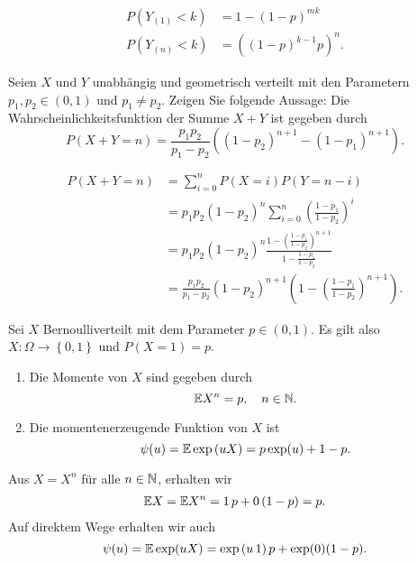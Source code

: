 \solution
\begin{align*}
    P\left( Y_{(1)} < k \right) &= 1 - \left( 1-p \right)^{mk} \\
    P\left( Y_{(n)} < k \right) &= \left( \left( 1-p \right)^{k-1} p \right)^n.
\end{align*}


 Seien $X$ und $Y$ unabhängig und geometrisch
verteilt mit den Parametern $p_1, p_2 \in (0,1)$ und $p_1\neq p_2$. Zeigen Sie folgende Aussage: 
Die Wahrscheinlichkeitsfunktion der Summe $X+Y$ ist gegeben durch
\begin{equation*}
    P(X+Y = n ) = \frac{p_1 p_2}{p_1 - p_2} \left( (1-p_2)^{n+1}- (1-p_1)^{n+1} \right).  
\end{equation*}

\solution 
\begin{align*}
    P( X+Y = n) &= \sum_{i=0}^{n} P(X=i)P(Y=n-i) \\
    &= p_1 p_2 (1-p_2)^n \sum_{i=0}^{n} \left( \frac{1-p_1}{1-p_2} \right)^{i} \\
    &=  p_1 p_2 (1-p_2)^n \frac{1 - \left( \frac{1-p_1}{1-p_2} \right)^{n+1}}{ 1- \frac{1-p_1}{1-p_2}} \\
    &= \frac{p_1 p_2}{ p_1 -p_2} (1-p_2)^{n+1}\left( 1 - \left( \frac{1-p_1}{1-p_2} \right)^{n+1} \right).
\end{align*}


Sei $X$ Bernoulliverteilt mit dem Parameter $p \in \left( 0,1 \right)$. Es gilt also
$X: \Omega \to \left\{ 0,1 \right\}$ und $P(X=1)=p$. 
\begin{enumerate}
    \item Die Momente von $X$ sind gegeben durch
        \begin{equation*}
            \mathbb{E} X^n = p, \quad n\in\mathbb N.
        \end{equation*}
    \item Die momentenerzeugende Funktion von $X$ ist 
        \begin{equation*}
            \psi(u) = \mathbb{E} \exp \left( u X \right) = p\exp (u)+1-p.
        \end{equation*} 
\end{enumerate}
\solution Aus $X = X^n$ für alle $n\in \mathbb N$, erhalten wir  
\begin{align*}
    \mathbb{E} X = \mathbb{E} X^n = 1\, p + 0\, (1-p) = p.
\end{align*}
Auf direktem Wege erhalten wir auch
\begin{equation*}
    \psi(u) = \mathbb{E} \exp (uX) = \exp\left( u\, 1 \right)p + \exp(0)(1-p).
\end{equation*}



